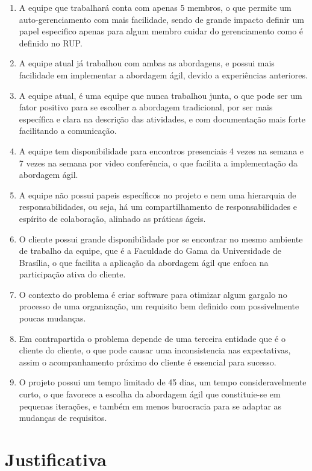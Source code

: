 \begin{enumerate}
  \item \label{mapeamento:1} A equipe que trabalhará conta com apenas 5 membros, o que permite um
  auto-gerenciamento com mais facilidade, sendo de grande impacto definir um
  papel especifico apenas para algum membro cuidar do gerenciamento como é definido no RUP.
  \item A equipe atual já trabalhou com ambas as abordagens, e possui mais facilidade
  em implementar a abordagem ágil, devido a experiências anteriores.
  \item A equipe atual, é uma equipe que nunca trabalhou junta, o que pode ser um
  fator positivo para se escolher a abordagem tradicional, por ser mais específica
  e clara na descrição das atividades, e com documentação mais forte facilitando a comunicação.
  \item A equipe tem disponibilidade para encontros presenciais 4 vezes na semana
  e 7 vezes na semana por video conferência, o que facilita a implementação da abordagem ágil.
  \item A equipe não possui papeis específicos no projeto e nem uma hierarquia de
  responsabilidades, ou seja, há um compartilhamento de responsabilidades e espírito
  de colaboração, alinhado as práticas ágeis.
  \item O cliente possui grande disponibilidade por se encontrar no mesmo ambiente
  de trabalho da equipe, que é a Faculdade do Gama da Universidade de Brasília,
  o que facilita a aplicação da abordagem ágil que enfoca na participação ativa do cliente.
  \item O contexto do problema é criar software para otimizar algum gargalo no processo
  de uma organização, um requisito bem definido com possivelmente poucas mudanças.
  \item Em contrapartida o problema depende de uma terceira entidade que é o cliente
  do cliente, o que pode causar uma inconsistencia nas expectativas, assim o acompanhamento
  próximo do cliente é essencial para sucesso.
  \item O projeto possui um tempo limitado de 45 dias, um tempo consideravelmente curto,
  o que favorece a escolha da abordagem ágil que constituie-se em pequenas iterações,
  e também em menos burocracia para se adaptar as mudanças de requisitos.
\end{enumerate}

\section{Justificativa}

